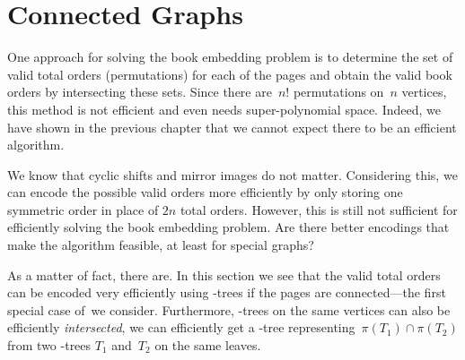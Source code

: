 \section{Connected Graphs}\label{section:connected}

One approach for solving the book embedding problem is to
determine the
set of valid total orders (permutations) for each of the pages and obtain
the valid book orders by intersecting these sets. Since there are~$n!$ 
permutations on~$n$ vertices, this method is not efficient and even needs super-polynomial space. Indeed, we have
shown in the previous chapter that we cannot expect there to be an efficient algorithm.

We know that cyclic shifts and mirror images do not matter. Considering this, 
we can encode the possible valid orders more efficiently by 
only storing one symmetric order in place of $2n$ total orders. However, this
is still not sufficient for efficiently solving the book embedding problem.
Are there better encodings that make the algorithm
feasible, at least for special graphs?

As a matter of fact, there are. In this section we see that the valid total orders can be encoded
very efficiently using \PQ-trees if the pages are connected---the first special case of~\probBook we consider. Furthermore, \PQ-trees on the
same vertices can also be efficiently \emph{intersected}, \ie we can efficiently 
get a \PQ-tree representing~$\pi(T_1) \cap \pi(T_2)$ from two \PQ-trees $T_1$ and~$T_2$ on the same leaves.


%

